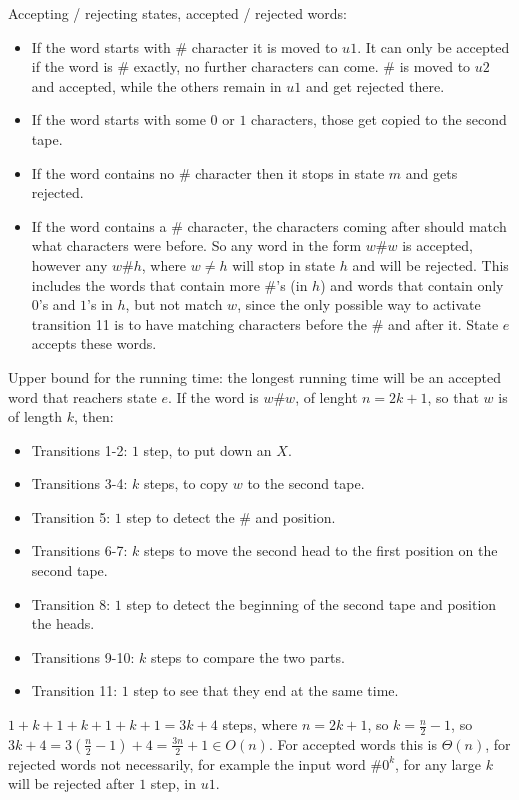 Accepting / rejecting states, accepted / rejected words:

\begin{itemize}
    \item If the word starts with $\#$ character it is moved to $u1$. It can only be accepted if the word is $\#$ exactly, no further characters can come. $\#$ is moved to $u2$ and accepted, while the others remain in $u1$ and get rejected there.
    \item If the word starts with some $0$ or $1$ characters, those get copied to the second tape.
    \item If the word contains no $\#$ character then it stops in state $m$ and gets rejected.
    \item If the word contains a $\#$ character, the characters coming after should match what characters were before. So any word in the form $w\#w$ is accepted, however any $w\#h$, where $w\neq{}h$ will stop in state $h$ and will be rejected. This includes the words that contain more $\#$'s (in $h$) and words that contain only $0$'s and $1$'s in $h$, but not match $w$, since the only possible way to activate transition 11 is to have matching characters before the $\#$ and after it. State $e$ accepts these words.
\end{itemize}

Upper bound for the running time: the longest running time will be an accepted word that reachers state $e$. If the word is $w\#w$, of lenght $n=2k+1$, so that $w$ is of length $k$, then:

\begin{itemize}
    \item Transitions 1-2: $1$ step, to put down an $X$.
    \item Transitions 3-4: $k$ steps, to copy $w$ to the second tape.
    \item Transition 5: $1$ step to detect the $\#$ and position.
    \item Transitions 6-7: $k$ steps to move the second head to the first position on the second tape.
    \item Transition 8: $1$ step to detect the beginning of the second tape and position the heads.
    \item Transitions 9-10: $k$ steps to compare the two parts.
    \item Transition 11: $1$ step to see that they end at the same time.
\end{itemize}

$1+k+1+k+1+k+1 = 3k+4$ steps, where $n=2k+1$, so $k=\frac{n}{2}-1$, so $3k+4 = 3(\frac{n}{2}-1)+4 = \frac{3n}{2}+1 \in{} O(n)$. For accepted words this is $\Theta(n)$, for rejected words not necessarily, for example the input word $\#0^k$, for any large $k$ will be rejected after $1$ step, in $u1$.